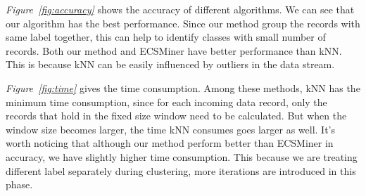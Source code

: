 \documentclass[runningheads]{llncs}
\begin{document}
	\textit{Figure~\ref{fig:accuracy}} shows the accuracy of different algorithms. We can see that our algorithm has the best performance. Since our method group the records with same label together, this can help to identify classes with small number of records. Both our method and ECSMiner have better performance than kNN. This is because kNN can be easily influenced by outliers in the data stream.
	
	\textit{Figure~\ref{fig:time}} gives the time consumption. Among these methods, kNN has the minimum time consumption, since for each incoming data record, only the records that hold in the fixed size window need to be calculated. But when the window size becomes larger, the time kNN consumes goes larger as well. It's worth noticing that although our method perform better than ECSMiner in accuracy, we have slightly higher time consumption. This because we are treating different label separately during clustering, more iterations are introduced in this phase.
	
	
\end{document}
